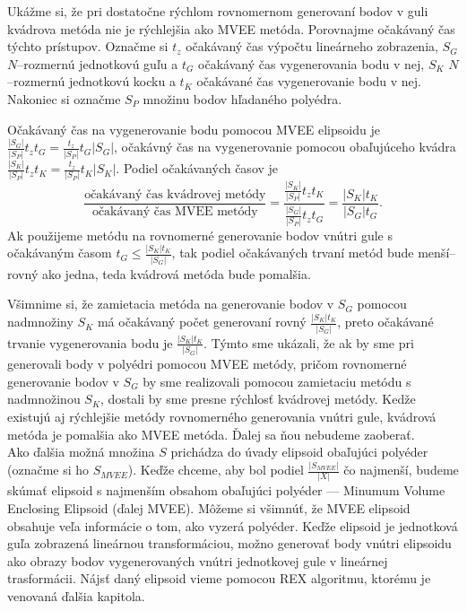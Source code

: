 Ukážme si, že pri dostatočne rýchlom rovnomernom generovaní bodov v guli kvádrova metóda nie je rýchlejšia ako MVEE metóda. Porovnajme očakávaný čas týchto prístupov. Označme si $t_z$ očakávaný čas výpočtu lineárneho zobrazenia, $S_G$ $N$--rozmernú jednotkovú guľu a $t_G$ očakávaný čas vygenerovania bodu v nej, $S_K$ $N$--rozmernú jednotkovú kocku a $t_K$ očakávané čas vygenerovanie bodu v nej. Nakoniec si označme $S_P$ množinu bodov hľadaného polyédra.

Očakávaný čas na vygenerovanie bodu pomocou MVEE elipsoidu je $\frac{|S_G|}{|S_P|}t_zt_G=\frac{t_z}{|S_P|}t_G|S_G|$, očakávný čas na vygenerovanie pomocou obaľujúceho kvádra $\frac{|S_K|}{|S_P|}t_zt_K=\frac{t_z}{|S_P|}t_K|S_K|$.
Podiel očakávaných časov je $$\frac{\text{očakávaný čas kvádrovej metódy}}{\text{očakávaný čas MVEE metódy}}=\frac{\frac{|S_K|}{|S_P|}t_zt_K}{\frac{|S_G|}{|S_P|}t_zt_G}=\frac{|S_K|t_K}{|S_G|t_G}.$$ Ak použijeme metódu na rovnomerné generovanie bodov vnútri gule s očakávaným časom $t_G \le \frac{|S_K|t_K}{|S_G|}$, tak podiel očakávaných trvaní metód bude menší--rovný ako jedna, teda kvádrová metóda bude pomalšia.

Všimnime si, že zamietacia metóda na generovanie bodov v $S_G$ pomocou nadmnožiny $S_K$ má očakávaný počet generovaní rovný $\frac{|S_K|t_K}{|S_G|}$, preto očakávané trvanie vygenerovania bodu je $\frac{|S_K|t_K}{|S_G|}$.
Týmto sme ukázali, že ak by sme pri generovali body v polyédri pomocou MVEE metódy, pričom rovnomerné generovanie bodov v $S_G$ by sme realizovali pomocou zamietaciu metódu s nadmnožinou $S_K$, dostali by sme presne rýchlosť kvádrovej metódy. Kedže existujú aj rýchlejšie metódy rovnomerného generovania vnútri gule, kvádrová metóda je pomalšia ako MVEE metóda. Ďalej sa ňou nebudeme zaoberať.\\



Ako ďalšia možná množina $S$ prichádza do úvady elipsoid obaľujúci polyéder (označme si ho $S_{MVEE}$). Keďže chceme, aby bol podiel $\frac{|S_{MVEE}|}{|X|}$ čo najmenší, budeme skúmať elipsoid s najmenším obsahom obaľujúci polyéder --- Minumum Volume Enclosing Elipsoid (ďalej MVEE). Môžeme si všimnúť, že MVEE elipsoid obsahuje veľa informácie o tom, ako vyzerá polyéder. Keďže elipsoid je jednotková guľa zobrazená lineárnou transformáciou, možno generovať body vnútri elipsoidu ako obrazy bodov vygenerovaných vnútri jednotkovej gule v lineárnej trasformácii. Nájsť daný elipsoid vieme pomocou REX algoritmu, ktorému je venovaná ďalšia kapitola.\\

